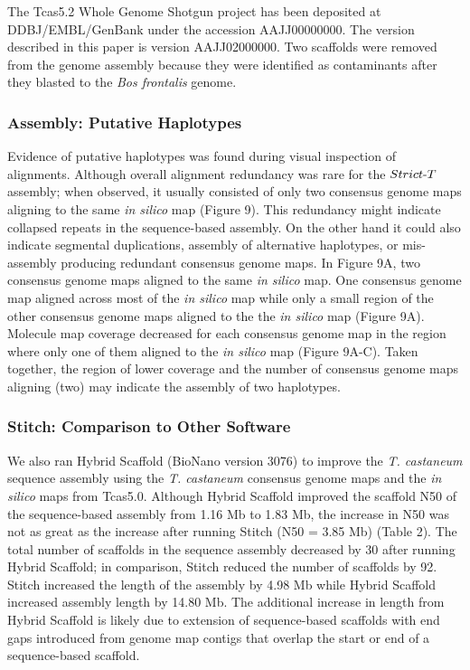 \documentclass{bmcart}
\begin{document}
The Tcas5.2 Whole Genome Shotgun project has been deposited at DDBJ/EMBL/GenBank under the accession AAJJ00000000. The version described in this paper is version AAJJ02000000. Two scaffolds were removed from the genome assembly because they were identified as contaminants after they blasted to the \textit{Bos frontalis} genome.

\subsubsection*{Assembly: Putative Haplotypes}

Evidence of putative haplotypes was found during visual inspection of alignments. Although overall alignment redundancy was rare for the $Strict\textnormal{-}T$ assembly; when observed, it usually consisted of only two consensus genome maps aligning to the same \textit{in silico} map (Figure 9). This redundancy might indicate collapsed repeats in the sequence-based assembly. On the other hand it could also indicate segmental duplications, assembly of alternative haplotypes, or mis-assembly producing redundant consensus genome maps. In Figure 9A, two consensus genome maps aligned to the same \textit{in silico} map. One consensus genome map aligned across most of the \textit{in silico} map while only a small region of the other consensus genome maps aligned to the the \textit{in silico} map (Figure 9A). Molecule map coverage decreased for each consensus genome map in the region where only one of them aligned to the \textit{in silico} map (Figure 9A-C). Taken together, the region of lower coverage and the number of consensus genome maps aligning (two) may indicate the assembly of two haplotypes. 

\subsubsection*{Stitch: Comparison to Other Software}

We also ran Hybrid Scaffold (BioNano version 3076) to improve the \textit{T. castaneum} sequence assembly using the \textit{T. castaneum} consensus genome maps and the \textit{in silico} maps from Tcas5.0. Although Hybrid Scaffold improved the scaffold N50 of the sequence-based assembly from 1.16 Mb to 1.83 Mb, the increase in N50 was not as great as the increase after running Stitch (N50 = 3.85 Mb) (Table 2). The total number of scaffolds in the sequence assembly decreased by 30 after running Hybrid Scaffold; in comparison, Stitch reduced the number of scaffolds by 92. Stitch increased the length of the assembly by 4.98 Mb while Hybrid Scaffold increased assembly length by 14.80 Mb. The additional increase in length from Hybrid Scaffold is likely due to extension of sequence-based scaffolds with end gaps introduced from genome map contigs that overlap the start or end of a sequence-based scaffold. 
\end{document}

